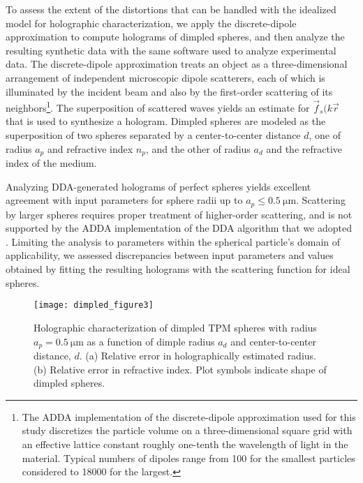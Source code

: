 To assess the extent of the distortions that can be handled with the
idealized model for holographic characterization, we apply the
discrete-dipole approximation \cite{draine94,yurkin11,fung12,perry12,wang14using}
to compute holograms of 
dimpled spheres, and then analyze the resulting synthetic data
with the same software used to analyze experimental data.
The discrete-dipole approximation treats an object as a three-dimensional
arrangement of independent microscopic dipole scatterers, each of which
is illuminated by the incident beam and also by the first-order scattering
of its neighbors\footnote{The ADDA implementation of the discrete-dipole approximation
\cite{yurkin11} used for this study discretizes the particle volume on a 
three-dimensional square grid with an effective lattice constant
roughly one-tenth the wavelength of light in the material.  Typical
numbers of dipoles range from \num{100} for the smallest particles
considered to \num{18000} for the largest.}.
The superposition of scattered waves yields an estimate for 
$\vec{f}_s(k\vec{r} $ that is used to synthesize a hologram.
Dimpled spheres are modeled as the superposition of
two spheres separated by a center-to-center distance $d$, one
of radius $a_p$ and refractive index $n_p$, and the other of radius
$a_d$ and the refractive index of the medium.

Analyzing DDA-generated holograms of perfect spheres yields 
excellent agreement
with input parameters for sphere radii up to $a_p \le \SI{0.5}{\um}$. 
Scattering by larger spheres requires proper treatment of higher-order scattering,
and is not supported by the ADDA implementation of the DDA algorithm
that we adopted \cite{yurkin11,wang14using}.
Limiting the analysis to parameters within the spherical particle's domain of
applicability, we assessed discrepancies between input parameters
and values obtained by fitting
the resulting holograms with the scattering function for ideal spheres.

\begin{figure}[!t]
  \centering
  \texttt{[image: dimpled\_figure3]}
  \caption{Holographic characterization of dimpled TPM spheres 
    with radius $a_p = \SI{0.5}{\um}$ as a function of dimple radius
    $a_d$ and center-to-center distance, $d$.
    (a) Relative error in holographically estimated radius.
    (b) Relative error in refractive index.
    Plot symbols indicate shape of dimpled spheres.}
  \label{fig:dimpledperformance}
\end{figure}

